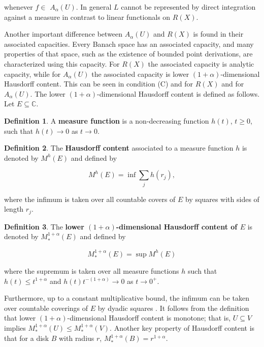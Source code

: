 \documentclass{article}
\theoremstyle{definition}
\newtheorem{definition}{Definition}
\begin{document}
\noindent whenever $f \in$ $A_{\alpha}(U)$. In general $L$ cannot be represented by direct integration against a measure in contrast to linear functionals on $R(X)$.



Another important difference between $A_{\alpha}(U)$ and $R(X)$ is found in their associated capacities. Every Banach space has an associated capacity, and many properties of that space, such as the existence of bounded point derivations, are characterized using this capacity. For $R(X)$ the associated capacity is analytic capacity, while for $A_{\alpha}(U)$ the associated capacity is lower $(1+\alpha)$-dimensional Hausdorff content. This can be seen in condition (C) and \cite{Hallstrom1969} for $R(X)$ and \cite{Lord1994} for $A_\alpha(U)$. The lower $(1+\alpha)$-dimensional Hausdorff content is defined as follows. Let $E \subseteq \mathbb C$.

\begin{definition}
A \textbf{measure function} is a non-decreasing function $h(t)$, $t\geq 0$, such that $h(t) \to 0$ as $t \to 0$.
\end{definition}

\begin{definition}
    The \textbf{Hausdorff content} associated to a measure function $h$ is denoted by $M^h(E)$ and defined by 

    \begin{equation*}
    M^h(E) = \inf \sum_j h(r_j),
\end{equation*}

\noindent where the infimum is taken over all countable covers of $E$ by squares with sides of length $r_j$.
\end{definition}




\begin{definition}
 The \textbf{lower $(1+\alpha)$-dimensional Hausdorff content of $E$} is denoted by $M_*^{1+\alpha}(E)$ and defined by 

\begin{equation*}
  M_*^{1+\alpha}(E)= \sup M^h(E) 
\end{equation*}


\noindent where the supremum is taken over all measure functions $h$ such that $h(t) \leq t^{1+\alpha}$ and $h(t)t^{-(1+\alpha)} \to 0$ as $t\to 0^+$.
\end{definition}


\noindent Furthermore, up to a constant multiplicative bound, the infimum can be taken over countable coverings of $E$ by dyadic squares \cite[pg. 61, Lemma 1.4]{Garnett}. It follows from the definition that lower $(1+\alpha)$-dimensional Hausdorff content is monotone; that is, $U \subseteq V$ implies $M_*^{1+\alpha}(U) \leq M_*^{1+\alpha}(V)$. Another key property of Hausdorff content is that for a disk $B$ with radius $r$, $M_*^{1+\alpha}(B) = r^{1+\alpha}$.
\end{document}
